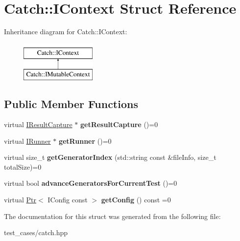 \hypertarget{structCatch_1_1IContext}{}\section{Catch\+:\+:I\+Context Struct Reference}
\label{structCatch_1_1IContext}
Inheritance diagram for Catch\+:\+:I\+Context\+:\begin{figure}[H]
\begin{center}
\leavevmode
\includegraphics[height=2.000000cm]{structCatch_1_1IContext}
\end{center}
\end{figure}
\subsection*{Public Member Functions}
\begin{DoxyCompactItemize}
\item 
\mbox{\label{structCatch_1_1IContext_a684e4ae71d1fdf3060c352ecde1d122f}} 
virtual \hyperlink{structCatch_1_1IResultCapture}{I\+Result\+Capture} $\ast$ {\bfseries get\+Result\+Capture} ()=0
\item 
\mbox{\label{structCatch_1_1IContext_af088415dde18d039ed5a2f95b02767c6}} 
virtual \hyperlink{structCatch_1_1IRunner}{I\+Runner} $\ast$ {\bfseries get\+Runner} ()=0
\item 
\mbox{\label{structCatch_1_1IContext_a43e07088db43299ba129fbe6d3106e95}} 
virtual size\+\_\+t {\bfseries get\+Generator\+Index} (std\+::string const \&file\+Info, size\+\_\+t total\+Size)=0
\item 
\mbox{\label{structCatch_1_1IContext_a806f7c4ed24d51adae90418e661b24b7}} 
virtual bool {\bfseries advance\+Generators\+For\+Current\+Test} ()=0
\item 
\mbox{\label{structCatch_1_1IContext_aee81c415899262e096ad8d6f686fa365}} 
virtual \hyperlink{classCatch_1_1Ptr}{Ptr}$<$ I\+Config const  $>$ {\bfseries get\+Config} () const =0
\end{DoxyCompactItemize}


The documentation for this struct was generated from the following file\+:\begin{DoxyCompactItemize}
\item 
test\+\_\+cases/catch.\+hpp\end{DoxyCompactItemize}
